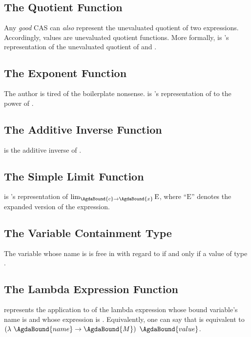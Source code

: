 \documentclass{report}
\begin{document}
\subsection{The Quotient Function}
Any \emph{good} CAS can \emph{also} represent the unevaluated quotient of two expressions.  Accordingly,  values are unevaluated quotient functions.  More formally,     is 's representation of the unevaluated quotient of  and .

\subsection{The Exponent Function}
The author is tired of the boilerplate nonsense.      is 's representation of  to the power of .

\subsection{The Additive Inverse Function}
   is the additive inverse of .

\subsection{The Simple Limit Function}
     is 's representation of \(\lim_{\AgdaBound{c} \rightarrow \AgdaBound{x}} \textrm{E}\), where ``\(\textrm{E}\)'' denotes the expanded version of the  expression.  %

\subsection{The Variable Containment Type}
The variable whose name is  is free in  with regard to  if and only if a value of type    .

\subsection{The Lambda Expression Function}
     represents the application to  of the lambda expression whose bound variable's name is  and whose expression is .  Equivalently, one can say that      is equivalent to \(\left(\lambda\ \AgdaBound{name} \rightarrow \AgdaBound{M}\right)\ \AgdaBound{value}\).
\end{document}
